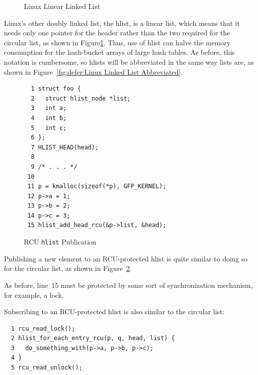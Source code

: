 \begin{figure}[tb]
\begin{center}
\end{center}
\caption{Linux Linear Linked List}
\label{fig:defer:Linux Linear Linked List}
\end{figure}

Linux's other doubly linked list, the hlist,
is a linear list, which means that
it needs only one pointer for the header rather than the two
required for the circular list, as shown in
Figure\ref{fig:defer:Linux Linear Linked List}.
Thus, use of hlist can halve the memory consumption for the hash-bucket
arrays of large hash tables.
As before, this notation is cumbersome, so hlists will be abbreviated
in the same way lists are, as shown in
Figure~\ref{fig:defer:Linux Linked List Abbreviated}.

\begin{figure}[tbp]
{ \scriptsize
\begin{verbatim}
  1 struct foo {
  2   struct hlist_node *list;
  3   int a;
  4   int b;
  5   int c;
  6 };
  7 HLIST_HEAD(head);
  8
  9 /* . . . */
 10
 11 p = kmalloc(sizeof(*p), GFP_KERNEL);
 12 p->a = 1;
 13 p->b = 2;
 14 p->c = 3;
 15 hlist_add_head_rcu(&p->list, &head);
\end{verbatim}
}
\caption{RCU {\tt hlist} Publication}
\label{fig:defer:RCU hlist Publication}
\end{figure}

Publishing a new element to an RCU-protected hlist is quite similar
to doing so for the circular list,
as shown in Figure~\ref{fig:defer:RCU hlist Publication}.

As before, line~15 must be protected by some sort of synchronization
mechanism, for example, a lock.

Subscribing to an RCU-protected hlist is also similar to the
circular list:

\vspace{5pt}
\begin{minipage}[t]{\columnwidth}
\scriptsize
\begin{verbatim}
  1 rcu_read_lock();
  2 hlist_for_each_entry_rcu(p, q, head, list) {
  3   do_something_with(p->a, p->b, p->c);
  4 }
  5 rcu_read_unlock();
\end{verbatim}
\end{minipage}
\vspace{5pt}

